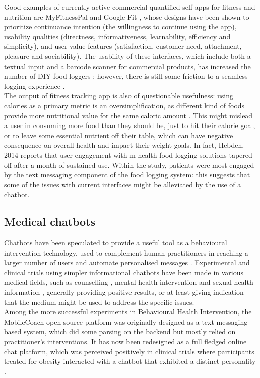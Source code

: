 Good examples of currently active commercial quantified self apps for fitness and nutrition are MyFitnessPal \cite{mfpwebsite} and Google Fit \cite{googlefitwebsite}, whose designs have been shown \cite{Suzianti2017} to prioritize continuance intention (the willingness to continue using the app), usability qualities (directness, informativeness, learnability, efficiency and simplicity), and user value features (satisfaction, customer need, attachment, pleasure and sociability). The usability of these interfaces, which include both a textual input and a barcode scanner for commercial products, has increased the number of DIY food loggers \cite{Alonso2015}; however, there is still some friction to a seamless logging experience \cite{Boushey2016}. \\
The output of fitness tracking app is also of questionable usefulness: using calories as a primary metric is an oversimplification, as different kind of foods provide more nutritional value for the same caloric amount \cite{webmdcalories}. This might mislead a user in consuming more food than they should be, just to hit their calorie goal, or to leave some essential nutrient off their table, which can have negative consequence on overall health and impact their weight goals. In fact, Hebden, 2014 \cite{hebden2014} reports that user engagement with m-health food logging solutions tapered off after a month of sustained use. Within the study, patients were most engaged by the text messaging component of the food logging system: this suggests that some of the issues with current interfaces might be alleviated by the use of a chatbot. 
\subsection{Medical chatbots} 
Chatbots have been speculated to provide a useful tool as a behavioural intervention technology, used to complement human practitioners in reaching a larger number of users and automate personalised messages \cite{Gabrielli2017}. Experimental and clinical trials using simpler informational chatbots have been made in various medical fields, such as counselling \cite{Cameron}, mental health intervention \cite{Elmasri2012} and sexual health information \cite{Brixey2017}, generally providing positive results, or at least giving indication that the medium might be used to address the specific issues. \\
Among the more successful experiments in Behavioural Health Intervention, the MobileCoach open source platform \cite{mobilecoacheu} was originally designed as a text messaging based system, which did some parsing on the backend but mostly relied on practitioner's interventions. It has now been redesigned as a full fledged online chat platform, which was perceived positively in clinical trials where participants treated for obesity interacted with a chatbot that exhibited a distinct personality \cite{Kowatsch2017}.


